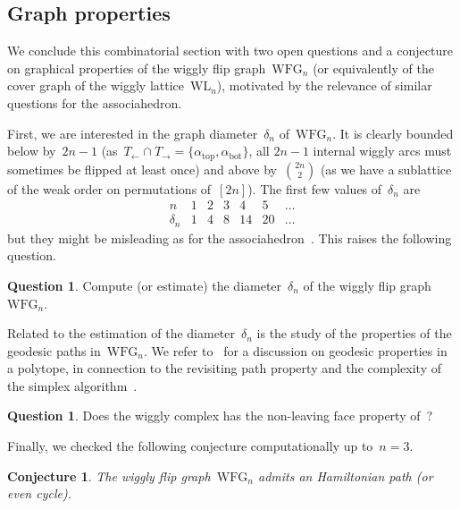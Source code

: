 \documentclass{amsart}
\newtheorem{conjecture}[theorem]{Conjecture}
\theoremstyle{definition}
\newtheorem{question}[theorem]{Question}
\newcommand{\wigglyFlipGraph}{\mathrm{WFG}} %
\newcommand{\wigglyLattice}{\mathrm{WL}} %
\begin{document}

\subsection{Graph properties}
\label{subsec:graphProperties}

We conclude this combinatorial section with two open questions and a conjecture on graphical properties of the wiggly flip graph~$\wigglyFlipGraph_n$ (or equivalently of the cover graph of the wiggly lattice~$\wigglyLattice_n$), motivated by the relevance of similar questions for the associahedron.

First, we are interested in the graph diameter~$\delta_n$ of~$\wigglyFlipGraph_n$.
It is clearly bounded below by~$2n-1$ (as~$T_\leftarrow \cap T_\rightarrow = \{\alpha_\mathrm{top}, \alpha_\mathrm{bot}\}$, all $2n-1$ internal wiggly arcs must sometimes be flipped at least once) and above by~$\binom{2n}{2}$ (as we have a sublattice of the weak order on permutations of~$[2n]$).
The first few values of~$\delta_n$ are
\[
\begin{array}{c|ccccccccc}
n & 1 & 2 & 3 & 4 & 5 & \dots \\
\hline
\delta_n & 1 & 4 & 8 & 14 & 20 & \dots
\end{array}
\]
but they might be misleading as for the associahedron~\cite{Pournin}.
This raises the following question.

\begin{question}
Compute (or estimate) the diameter~$\delta_n$ of the wiggly flip graph~$\wigglyFlipGraph_n$.
\end{question}

Related to the estimation of the diameter~$\delta_n$ is the study of the properties of the geodesic paths in~$\wigglyFlipGraph_n$.
We refer to~\cite{CeballosPilaud-diameterDAssociahedron} for a discussion on geodesic properties in a polytope, in connection to the revisiting path property and the complexity of the simplex algorithm~\cite{Santos-surveyHirsch,Santos-Hirsch}.

\begin{question}
Does the wiggly complex has the non-leaving face property of~\cite{CeballosPilaud-diameterDAssociahedron}?
\end{question}

Finally, we checked the following conjecture computationally up to~$n = 3$.

\begin{conjecture}
\label{conj:Hamiltonian}
The wiggly flip graph~$\wigglyFlipGraph_n$ admits an Hamiltonian path (or even cycle).
\end{conjecture}
\end{document}
